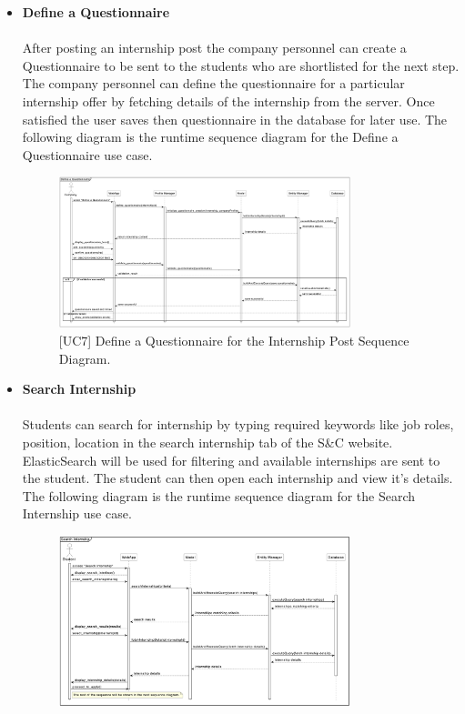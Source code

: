 \begin{itemize}
\begin{figure}[H]
    \caption{\label{fig:metamodel9}[UC6] Get suggestion on Internship Post Advertisement Sequence Diagram.}
    \end{figure}
    \item \textbf{Define a Questionnaire} \\ \\
    After posting an internship post the company personnel can create a Questionnaire to be sent to the students who are shortlisted for the next step. The company personnel can define the questionnaire for a particular internship offer by fetching details of the internship from the server. Once satisfied the user saves then questionnaire in the database for later use. The following diagram is the runtime sequence diagram for the Define a Questionnaire use case.
    \begin{figure}[H]
    \centering
    \includegraphics[width=0.8\textwidth]{Images/Define_Questionnaire_Sequnce_Diagram.png}
    \caption{\label{fig:metamodel9}[UC7] Define a Questionnaire for the Internship Post Sequence Diagram.}
    \end{figure}
    \item \textbf{Search Internship} \\ \\
    Students can search for internship by typing required keywords like job roles, position, location in the search internship tab of the S\&C website. ElasticSearch will be used for filtering and available internships are sent to the student. The student can then open each internship and view it's details. The following diagram is the runtime sequence diagram for the Search Internship use case.
    \begin{figure}[H]
    \centering
    \includegraphics[width=0.8\textwidth]{Images/Search_Internship_Sequence_Diagram.png}

\end{figure}
\end{itemize}
